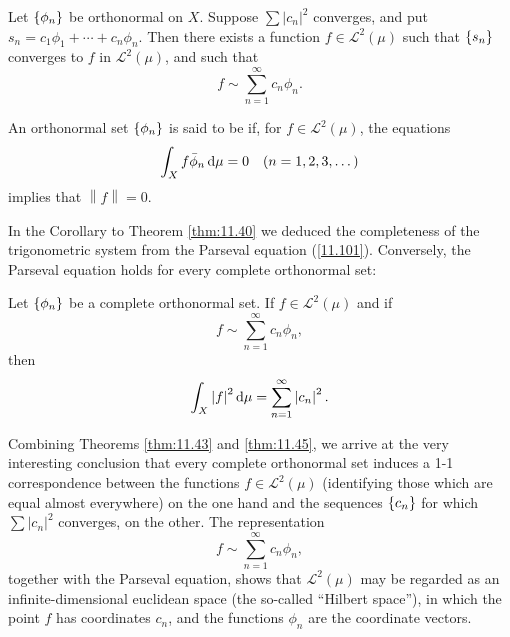 \begin{thm}
    \label{thm:11.43}
    Let $\protect\{\phi_n\}$ be orthonormal on $X$. 
    Suppose $\sum \left| c_n \right|^2$ converges, 
    and put $s_n = c_1 \phi_1 + \cdots + c_n\phi_n$. 
    Then there exists a function $f \in \mathscr{L}^2(\mu)$
    such that $\protect\{s_n\}$ converges to $f$ in $\mathscr{L}^2(\mu)$, 
    and such that
    \begin{equation*}
        f \sim \sum_{n=1}^{\infty}c_n \phi_n .
    \end{equation*}
\end{thm}

\begin{mydef}
    \label{mydef:11.44}
    An orthonormal set $\protect\{\phi_n\}$ is said to be  if, for $f \in \mathscr{L}^2(\mu)$, the equations
    \begin{equation*}
        \int_X f \bar{\phi}_n \d \mu = 0
        \quad (n = 1,2,3,\dots)
    \end{equation*}
    implies that $\left\| f \right\| = 0$.
\end{mydef}


In the Corollary to Theorem \ref{thm:11.40} 
we deduced the completeness of the
trigonometric system from the Parseval equation (\ref{11.101}). 
Conversely, the Parseval
equation holds for every complete orthonormal set:

\begin{thm}
    \label{thm:11.45}
    Let $\protect\{\phi_n\}$ be a complete orthonormal set. 
    If $f \in \mathscr{L}^2(\mu)$ and if
    \begin{equation}
        \label{eq:11.106}
        f \sim \sum_{n=1}^{\infty} c_n \phi_n,
    \end{equation}
    then 
    \begin{equation}
        \label{eq:11.107}
        \int_X \left| f \right|^2 \d \mu =
        \sum_{n=1}^{\infty} \left| c_n \right|^2 .
    \end{equation}
\end{thm}


Combining Theorems \ref{thm:11.43} and \ref{thm:11.45}, we arrive at the very interesting
conclusion that every complete orthonormal set induces a 1-1 correspondence
between the functions $f \in \mathscr{L}^2(\mu)$ 
(identifying those which are equal almost everywhere)
on the one hand and the sequences $\protect\{c_n\}$ for which $\sum \left| c_n \right|^2$ converges,
on the other. The representation
\begin{equation*}
    f \sim \sum_{n=1}^{\infty} c_n \phi_n ,
\end{equation*}
together with the Parseval equation, shows that $\mathscr{L}^2(\mu)$ may be regarded as an
infinite-dimensional euclidean space (the so-called ``Hilbert space''), in which
the point $f$ has coordinates $c_n$, and the functions $\phi_n$ are the coordinate vectors.